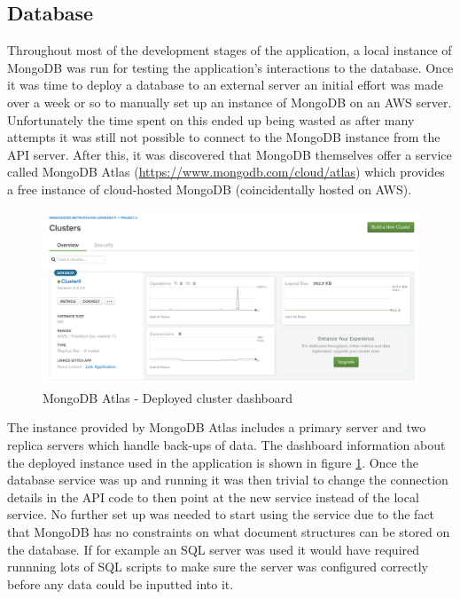 \documentclass[a4paper,12pt]{report}
\begin{document}
    \subsection{Database}
      Throughout most of the development stages of the application, a local instance of MongoDB was run for testing the application's interactions to the database. Once it was time to deploy a database to an external server an initial effort was made over a week or so to manually set up an instance of MongoDB on an AWS server. Unfortunately the time spent on this ended up being wasted as after many attempts it was still not possible to connect to the MongoDB instance from the API server. After this, it was discovered that MongoDB themselves offer a service called MongoDB Atlas (\url{https://www.mongodb.com/cloud/atlas}) which provides a free instance of cloud-hosted MongoDB (coincidentally hosted on AWS).

      \begin{figure}[h]
        \centering
        \includegraphics[width=0.8\linewidth]{mongodb-atlas-dashboard}
        \caption{MongoDB Atlas - Deployed cluster dashboard}
        \label{fig:mongodb-atlas-dashboard}
      \end{figure}

      The instance provided by MongoDB Atlas includes a primary server and two replica servers which handle back-ups of data. The dashboard information about the deployed instance used in the application is shown in figure \ref{fig:mongodb-atlas-dashboard}. Once the database service was up and running it was then trivial to change the connection details in the API code to then point at the new service instead of the local service. No further set up was needed to start using the service due to the fact that MongoDB has no constraints on what document structures can be stored on the database. If for example an SQL server was used it would have required runnning lots of SQL scripts to make sure the server was configured correctly before any data could be inputted into it.
\end{document}
